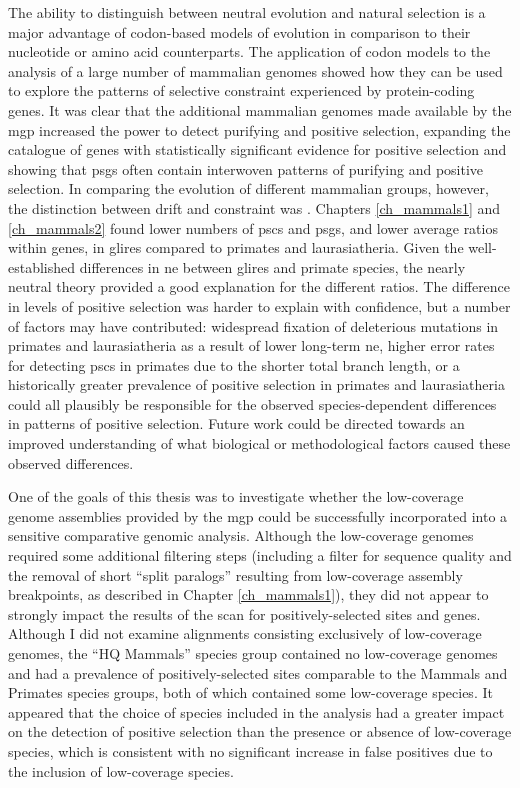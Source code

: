 The ability to distinguish between neutral evolution and natural
selection is a major advantage of codon-based models of evolution in
comparison to their nucleotide or amino acid counterparts. The
application of codon models to the analysis of a large number of
mammalian genomes showed how they can be used to explore the patterns
of selective constraint experienced by protein-coding genes. It was
clear that the additional mammalian genomes made available by the
\acl{mgp} increased the power to detect purifying and positive
selection, expanding the catalogue of genes with statistically
significant evidence for positive selection and showing that \acp{psg}
often contain interwoven patterns of purifying and positive
selection. In comparing the evolution of different mammalian groups,
however, the distinction between drift and constraint was
. Chapters \ref{ch_mammals1} and
\ref{ch_mammals2} found lower numbers of \acp{psc} and \acp{psg}, and
lower average \dnds ratios within genes, in glires compared to
primates and laurasiatheria. Given the well-established differences in
\ac{ne} between glires and primate species, the nearly neutral theory
provided a good explanation for the different \dnds ratios. The
difference in levels of positive selection was harder to explain with
confidence, but a number of factors may have contributed: widespread
fixation of deleterious mutations in primates and laurasiatheria as a
result of lower long-term \ac{ne}, higher error rates for detecting
\acp{psc} in primates due to the shorter total branch length, or a
historically greater prevalence of positive selection in primates and
laurasiatheria could all plausibly be responsible for the observed
species-dependent differences in patterns of positive
selection. Future work could be directed towards an improved
understanding of what biological or methodological factors caused
these observed differences.


One of the goals of this thesis was to investigate whether the
low-coverage genome assemblies provided by the \ac{mgp} could be
successfully incorporated into a sensitive comparative genomic
analysis. Although the low-coverage genomes required some additional
filtering steps (including a filter for sequence quality and the
removal of short ``split paralogs'' resulting from low-coverage
assembly breakpoints, as described in Chapter \ref{ch_mammals1}), they
did not appear to strongly impact the results of the scan for
positively-selected sites and genes. Although I did not examine
alignments consisting exclusively of low-coverage genomes, the ``HQ
Mammals'' species group contained no low-coverage genomes and had a
prevalence of positively-selected sites comparable to the Mammals and
Primates species groups, both of which contained some low-coverage
species. It appeared that the choice of species included in the
analysis had a greater impact on the detection of positive selection
than the presence or absence of low-coverage species, which is
consistent with no significant increase in false positives due to the
inclusion of low-coverage species.

